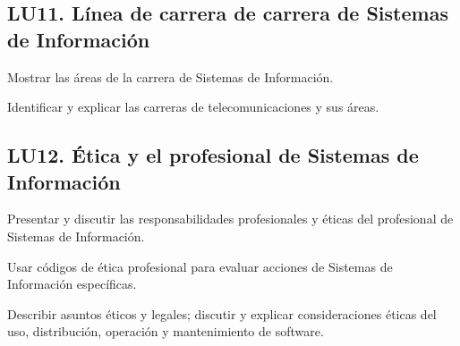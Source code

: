 \subsection{LU11. Línea de carrera de carrera de Sistemas de Información}\label{sec:LU11}
\begin{LearningUnit}
\begin{LUGoal}
\item Mostrar las áreas de la carrera de Sistemas de Información.
\end{LUGoal}

\begin{LUObjective}
\item Identificar y explicar las carreras de telecomunicaciones y sus áreas.
\end{LUObjective}
\end{LearningUnit}

\subsection{LU12. Ética y el profesional de Sistemas de Información}\label{sec:LU12}
\begin{LearningUnit}
\begin{LUGoal}
\item Presentar y discutir las responsabilidades profesionales y éticas del profesional de Sistemas de Información.
\end{LUGoal}

\begin{LUObjective}
\item Usar códigos de ética profesional para evaluar acciones de Sistemas de Información específicas.
\item Describir asuntos éticos y legales; discutir y explicar consideraciones éticas del uso, distribución, operación y mantenimiento de software.
\end{LUObjective}
\end{LearningUnit}

